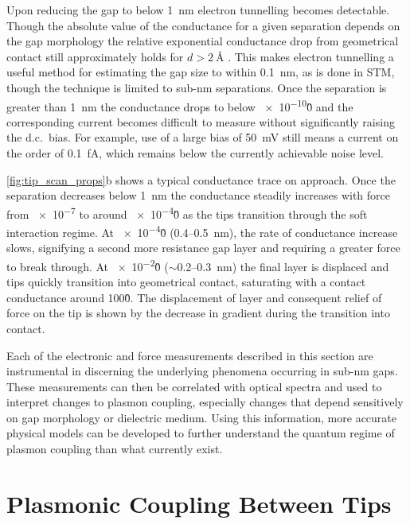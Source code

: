 \documentclass[a4paper]{article}
\begin{document}
Upon reducing the gap to below \SI{1}{nm} electron tunnelling becomes detectable. Though the absolute value of the conductance for a given separation depends on the gap morphology the relative exponential conductance drop from geometrical contact still approximately holds for $d>\SI{2}{\angstrom}$ \cite{esteban2015}. This makes electron tunnelling a useful method for estimating the gap size to within \SI{0.1}{nm}, as is done in STM, though the technique is limited to sub-nm separations. Once the separation is greater than \SI{1}{nm} the conductance drops to below \num{e-10}\G0 and the corresponding current becomes difficult to measure without significantly raising the d.c.\ bias. For example, use of a large bias of \SI{50}{mV} still means a current on the order of \SI{0.1}{fA}, which remains below the currently achievable noise level.

\autoref{fig:tip_scan_props}b shows a typical conductance trace on approach. Once the separation decreases below \SI{1}{nm} the conductance steadily increases with force from \num{e-7} to around \num{e-4}\G0 as the tips transition through the soft interaction regime. At \num{e-4}\G0 (0.4--\SI{0.5}{nm}), the rate of conductance increase slows, signifying a second more resistance gap layer and requiring a greater force to break through. At \num{e-2}\G0 ($\sim$0.2--\SI{0.3}{nm}) the final layer is displaced and tips quickly transition into geometrical contact, saturating with a contact conductance around 100\G0. The displacement of layer and consequent relief of force on the tip is shown by the decrease in gradient during the transition into contact.

Each of the electronic and force measurements described in this section are instrumental in discerning the underlying phenomena occurring in sub-nm gaps. These measurements can then be correlated with optical spectra and used to interpret changes to plasmon coupling, especially changes that depend sensitively on gap morphology or dielectric medium. Using this information, more accurate physical models can be developed to further understand the quantum regime of plasmon coupling than what currently exist.

\section{Plasmonic Coupling Between Tips}
\end{document}
